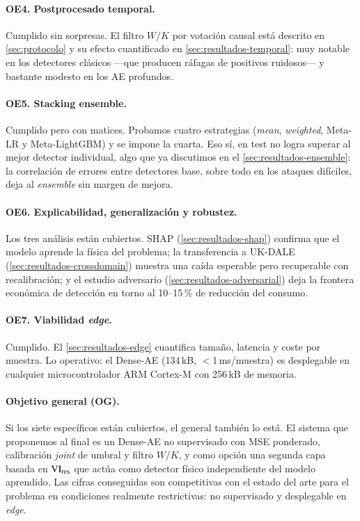 \paragraph{OE4. Postprocesado temporal.}
Cumplido sin sorpresas. El filtro $W/K$ por votación causal está descrito en \cref{sec:protocolo} y su efecto cuantificado en \cref{sec:resultados-temporal}: muy notable en los detectores clásicos ---que producen ráfagas de positivos ruidosos--- y bastante modesto en los AE profundos.

\paragraph{OE5. Stacking ensemble.}
Cumplido pero con matices. Probamos cuatro estrategias (\textit{mean}, \textit{weighted}, Meta-LR y Meta-LightGBM) y se impone la cuarta. Eso sí, en test no logra superar al mejor detector individual, algo que ya discutimos en el \cref{sec:resultados-ensemble}: la correlación de errores entre detectores base, sobre todo en los ataques difíciles, deja al \textit{ensemble} sin margen de mejora.

\paragraph{OE6. Explicabilidad, generalización y robustez.}
Los tres análisis están cubiertos. SHAP (\cref{sec:resultados-shap}) confirma que el modelo aprende la física del problema; la transferencia a UK-DALE (\cref{sec:resultados-crossdomain}) muestra una caída esperable pero recuperable con recalibración; y el estudio adversario (\cref{sec:resultados-adversarial}) deja la frontera económica de detección en torno al 10--15\,\% de reducción del consumo.

\paragraph{OE7. Viabilidad \textit{edge}.}
Cumplido. El \cref{sec:resultados-edge} cuantifica tamaño, latencia y coste por muestra. Lo operativo: el Dense-AE (134\,kB, $<$1\,\si{\milli\second}/muestra) es desplegable en cualquier microcontrolador ARM Cortex-M con 256\,kB de memoria.

\paragraph{Objetivo general (OG).}
Si los siete específicos están cubiertos, el general también lo está. El sistema que proponemos al final es un Dense-AE no supervisado con MSE ponderado, calibración \textit{joint} de umbral y filtro $W/K$, y como opción una segunda capa basada en $\mathrm{VI}_{\text{res}}$ que actúa como detector físico independiente del modelo aprendido. Las cifras conseguidas son competitivas con el estado del arte para el problema en condiciones realmente restrictivas: no supervisado y desplegable en \textit{edge}.

